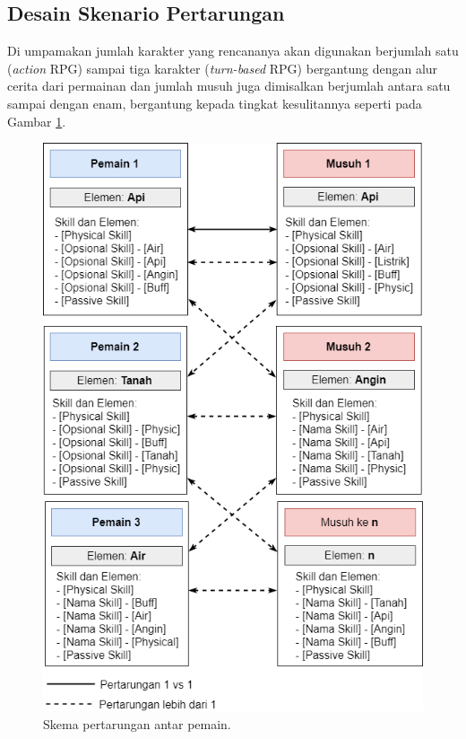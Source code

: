 \begin{subs}
	\subsection{Desain Skenario Pertarungan}
	\label{sec:sub_sec3_design_skenario}
	\vspace{1ex}
	
	Di umpamakan jumlah karakter yang rencananya akan digunakan berjumlah satu (\textit{action} RPG) sampai tiga karakter (\textit{turn-based} RPG) bergantung dengan alur cerita dari permainan dan jumlah musuh juga dimisalkan berjumlah antara satu sampai dengan enam, bergantung kepada tingkat kesulitannya seperti pada Gambar \ref{fig:battle_player}. 
	\vspace{1ex}
	
	\begin{figure} [!h] \centering
		\includegraphics[scale=0.5]{img/battle_player_new.png}
		\caption{Skema pertarungan antar pemain.}
		\label{fig:battle_player}
	\end{figure}
	

\end{subs}
